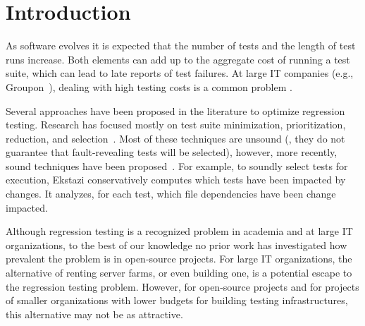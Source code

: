 \section{Introduction}


As software evolves it is expected that the number of tests and the
length of test runs increase.  Both elements can add up to the
aggregate cost of running a test suite, which can lead to late reports of test
failures.  At large IT companies (e.g.,
Groupon~\cite{kim-etal-fse2013}), dealing with high testing costs is a
common problem .  

Several approaches have been proposed in the literature to optimize
regression testing.  Research has focused mostly on test suite
minimization, prioritization, reduction, and
selection~\cite{yoo-harman-stvr2012}.  Most of these techniques are
unsound (\ie{}, they do not guarantee that fault-revealing tests will
be selected), however, more recently, sound techniques have been
proposed~\cite{gligoric-etal-issta2015,soetens-etal-2016}.  For
example, to soundly select tests for execution,
Ekstazi\cite{ekstazi-web,gligoric-etal-issta2015} conservatively
computes which tests have been impacted by changes.  It analyzes, for
each test, which file dependencies have been change impacted.


Although regression testing is a recognized problem in academia and at
large IT organizations, to the best of our knowledge no prior work has
investigated how prevalent the problem is in open-source projects.
For large IT organizations, the alternative of renting server farms,
or even building one, is a potential escape to the regression testing
problem.  However, for open-source projects and for projects of
smaller organizations with lower budgets for building testing
infrastructures, this alternative may not be as attractive.

\newcommand{\numSubjs}{143}

